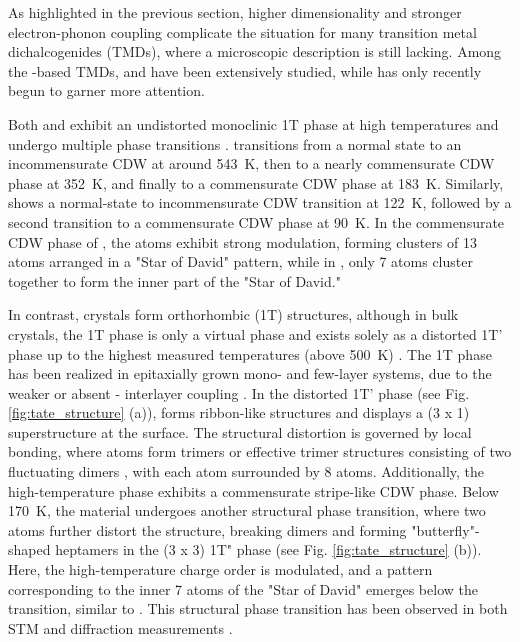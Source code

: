 As highlighted in the previous section, higher dimensionality and stronger electron-phonon coupling complicate the situation for many transition metal dichalcogenides (TMDs), where a microscopic description is still lacking.
Among the -based TMDs,  and  have been extensively studied, while  has only recently begun to garner more attention.

Both  and  exhibit an undistorted monoclinic 1T phase at high temperatures and undergo multiple phase transitions \cite{pouget_structural_2024,lin_evidence_2022}.
 transitions from a normal state to an incommensurate CDW at around \qty{543}{\kelvin}, then to a nearly commensurate CDW phase at \qty{352}{\kelvin}, and finally to a commensurate CDW phase at \qty{183}{\kelvin}.
Similarly,  shows a normal-state to incommensurate CDW transition at \qty{122}{\kelvin}, followed by a second transition to a commensurate CDW phase at \qty{90}{\kelvin}.
In the commensurate CDW phase of , the  atoms exhibit strong modulation, forming clusters of 13 atoms arranged in a "Star of David" pattern, while in , only 7 atoms cluster together to form the inner part of the "Star of David."

In contrast,  crystals form orthorhombic (1T) structures, although in bulk crystals, the 1T phase is only a virtual phase and exists solely as a distorted 1T' phase up to the highest measured temperatures (above \qty{500}{\kelvin}) \cite{petkov_exotic_2020}.
The 1T phase has been realized in epitaxially grown mono- and few-layer systems, due to the weaker or absent - interlayer coupling \cite{hwang_novel_2022, wang_polymorphic_2024}.
In the distorted 1T' phase (see Fig. \ref{fig:tate_structure} (a)),  forms ribbon-like structures and displays a (3 x 1) superstructure at the surface.
The structural distortion is governed by local bonding, where  atoms form trimers or effective trimer structures consisting of two fluctuating dimers \cite{katayama_observation_2023}, with each  atom surrounded by 8  atoms.
Additionally, the high-temperature phase exhibits a commensurate stripe-like CDW phase.
Below \qty{170}{\kelvin}, the material undergoes another structural phase transition, where two  atoms further distort the structure, breaking dimers and forming "butterfly"-shaped heptamers in the (3 x 3) 1T" phase \cite{feng_charge_2016, katayama_observation_2023} (see Fig. \ref{fig:tate_structure} (b)).
Here, the high-temperature charge order is modulated, and a pattern corresponding to the inner 7 atoms of the "Star of David" emerges below the transition, similar to .
This structural phase transition has been observed in both STM and diffraction measurements \cite{feng_charge_2016, siddiqui_ultrafast_2021, domrose_femtosecond_2024}.

